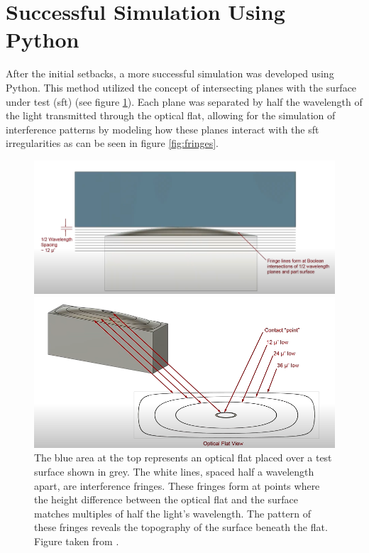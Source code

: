 \documentclass[../main.tex]{subfiles}
\begin{document}
\section{Successful Simulation Using Python}
\vspace{-15pt}
After the initial setbacks, a more successful simulation was developed using Python. This method utilized the concept of intersecting planes with the surface under test (sft) (see figure \ref{fig:planes_intersection}). Each plane was separated by half the wavelength of the light transmitted through the optical flat, allowing for the simulation of interference patterns by modeling how these planes interact with the sft irregularities as can be seen in figure \ref{fig:fringes}.
\vspace{-15pt}
\begin{figure}[H]
    \centering
    \hfill
    \begin{minipage}{0.49\textwidth}
        \centering
        \includegraphics[width=0.95\linewidth]{Images/Methods/planes}
        \caption{
            The blue area at the top represents an optical flat placed over a test surface shown in grey. The white lines, spaced half a wavelength apart, are interference fringes. These fringes form at points where the height difference between the optical flat and the surface matches multiples of half the light's wavelength. The pattern of these fringes reveals the topography of the surface beneath the flat. Figure taken from \cite{youtube}.}
        \label{fig:planes_intersection}
    \end{minipage}
    \hfill
    \begin{minipage}{0.49\textwidth}
        \centering
        \includegraphics[width=1\linewidth]{Images/Methods/planes_fringee}

\end{minipage}
\end{figure}
\end{document}
